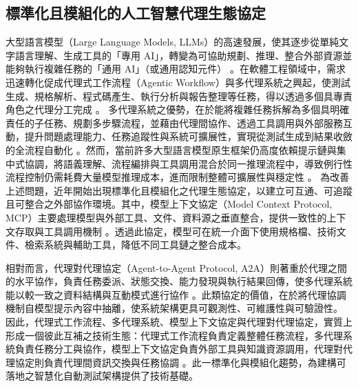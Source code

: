 \begin{ZhChapter}
\section{標準化且模組化的人工智慧代理生態協定}
\text 大型語言模型（Large Language Models, LLMs）的高速發展，使其逐步從單純文字語言理解、生成工具的「專用 AI」，轉變為可協助規劃、推理、整合外部資源並能夠執行複雜任務的「通用 AI」（或通用認知元件） \parencite{Wang2024Software, Borghoff2025Beyond}。在軟體工程領域中，需求迅速轉化促成代理式工作流程（Agentic Workflow）與多代理系統之興起，使測試生成、規格解析、程式碼產生、執行分析與報告整理等任務，得以透過多個具專責角色之代理分工完成 \parencite{Bandi2025Rise, Hou2025MCP}。
\text 多代理系統之優勢，在於能將複雜任務拆解為多個具明確責任的子任務、規劃多步驟流程，並藉由代理間協作、透過工具調用與外部服務互動，提升問題處理能力、任務追蹤性與系統可擴展性，實現從測試生成到結果收斂的全流程自動化 \parencite{Anonymous2023LLMGenerators, Borghoff2025Beyond}。然而，當前許多大型語言模型原生框架仍高度依賴提示鏈與集中式協調，將語義理解、流程編排與工具調用混合於同一推理流程中，導致例行性流程控制仍需耗費大量模型推理成本，進而限制整體可擴展性與穩定性 \parencite{Borghoff2025Beyond}。
\text 為改善上述問題，近年開始出現標準化且模組化之代理生態協定，以建立可互通、可追蹤且可整合之外部協作環境。其中，模型上下文協定（Model Context Protocol, MCP）主要處理模型與外部工具、文件、資料源之垂直整合，提供一致性的上下文存取與工具調用機制 \parencite{Hou2025MCP, Ehtesham2025SurveyMCPACPA2AANP}。透過此協定，模型可在統一介面下使用規格檔、技術文件、檢索系統與輔助工具，降低不同工具鏈之整合成本。

\text 相對而言，代理對代理協定（Agent-to-Agent Protocol, A2A）則著重於代理之間的水平協作，負責任務委派、狀態交換、能力發現與執行結果回傳，使多代理系統能以較一致之資料結構與互動模式進行協作 \parencite{Borghoff2025Beyond, Ehtesham2025SurveyMCPACPA2AANP}。此類協定的價值，在於將代理協調機制自模型提示內容中抽離，使系統架構更具可觀測性、可維護性與可驗證性。
\text 因此，代理式工作流程、多代理系統、模型上下文協定與代理對代理協定，實質上形成一個彼此互補之技術生態：代理式工作流程負責定義整體任務流程，多代理系統負責任務分工與協作，模型上下文協定負責外部工具與知識資源調用，代理對代理協定則負責代理間資訊交換與任務協調 \parencite{Bandi2025Rise, Hou2025MCP, Ehtesham2025SurveyMCPACPA2AANP}。此一標準化與模組化趨勢，為建構可落地之智慧化自動測試架構提供了技術基礎。


\end{ZhChapter}
